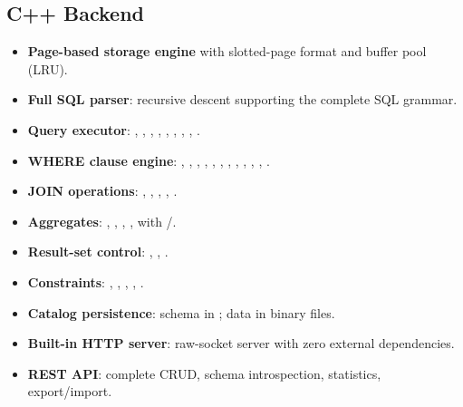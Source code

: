 \subsection{C++ Backend}
\begin{itemize}[nosep]
  \item \textbf{Page-based storage engine} with slotted-page format and buffer pool (LRU).
  \item \textbf{Full SQL parser}: recursive descent supporting the complete SQL grammar.
  \item \textbf{Query executor}: , , , , , , , , .
  \item \textbf{WHERE clause engine}: \code{=}, \code{!=}, \code{>}, \code{<}, \code{>=}, \code{<=}, , , , , , .
  \item \textbf{JOIN operations}: , , , , .
  \item \textbf{Aggregates}: , , , ,  with /.
  \item \textbf{Result-set control}: , , .
  \item \textbf{Constraints}: , , , , .
  \item \textbf{Catalog persistence}: schema in ; data in  binary files.
  \item \textbf{Built-in HTTP server}: raw-socket server with zero external dependencies.
  \item \textbf{REST API}: complete CRUD, schema introspection, statistics, export/import.
\end{itemize}

